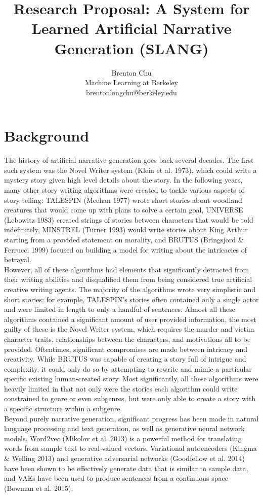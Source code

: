 \documentclass[letter]{article}
\title{Research Proposal: A System for Learned Artificial Narrative Generation (SLANG)}
\author{Brenton Chu\\Machine Learning at Berkeley\\brentonlongchu@berkeley.edu}
\newcommand\tab[1][1cm]{\hspace*{#1}}
\begin{document}
\maketitle
\section{Background}
\tab The history of artificial narrative generation goes back several decades. The first such system was the Novel Writer system (Klein et al. 1973), which could write a mystery story given high level details about the story. In the following years, many other story writing algorithms were created to tackle various aspects of story telling: TALESPIN (Meehan 1977) wrote short stories about woodland creatures that would come up with plans to solve a certain goal, UNIVERSE (Lebowitz 1983) created strings of stories between characters that would be told indefinitely, MINSTREL (Turner 1993) would write stories about King Arthur starting from a provided statement on morality, and BRUTUS (Bringsjord \& Ferrucci 1999) focused on building a model for writing about the intricacies of betrayal.\\
\tab However, all of these algorithms had elements that significantly detracted from their writing abilities and disqualified them from being considered true artificial creative writing agents. The majority of the algorithms wrote very simplistic and short stories; for example, TALESPIN's stories often contained only a single actor and were limited in length to only a handful of sentences. Almost all these algorithms contained a significant amount of user provided information, the most guilty of these is the Novel Writer system, which requires the murder and victim character traits, relationships between the characters, and motivations all to be provided. Oftentimes, significant compromises are made between intricacy and creativity. While BRUTUS was capable of creating a story full of intrigue and complexity, it could only do so by attempting to rewrite and mimic a particular specific existing human-created story. Most significantly, all these algorithms were heavily limited in that not only were the stories each algorithm could write constrained to genre or even subgenres, but were only able to create a story with a specific structure within a subgenre.\\
\tab Beyond purely narrative generation, significant progress has been made in natural language processing and text generation, as well as generative neural network models. Word2vec (Mikolov et al. 2013) is a powerful method for translating words from sample text to real-valued vectors. Variational autoencoders (Kingma \& Welling 2013) and generative adversarial networks (Goodfellow et al. 2014) have been shown to be effectively generate data that is similar to sample data, and VAEs have been used to produce sentences from a continuous space (Bowman et al. 2015).
\end{document}

